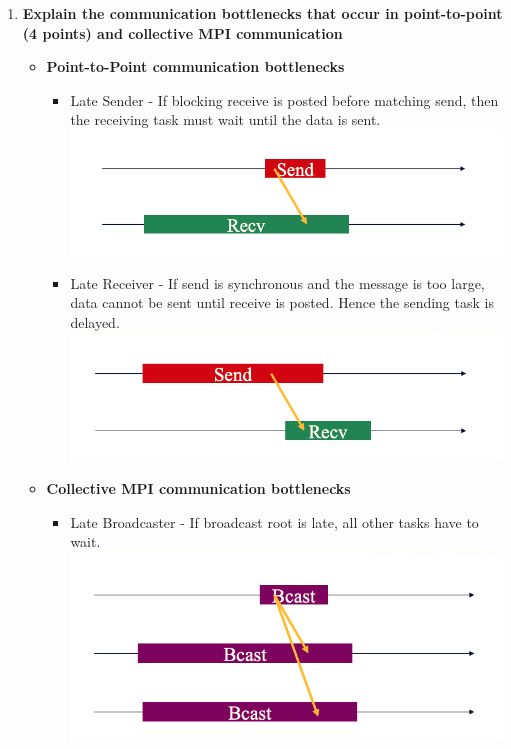 \documentclass[10pt, letterpaper, twoside]{article}
\begin{document}
\begin{titlepage}
\begin{enumerate}
\item \textbf{Explain the communication bottlenecks that occur in point-to-point (4 points) and collective MPI communication}
\begin{itemize}
	\item \textbf{Point-to-Point communication bottlenecks}
	\begin{itemize}
		\item Late Sender - If blocking receive is posted before matching send, then the receiving task must wait until the data is sent.\\
		\includegraphics[scale = 0.5]{late_sender.png}
		\item Late Receiver - If send is synchronous and the message is too large, data cannot be sent until receive is posted. Hence the sending task is delayed. \\
		\includegraphics[scale = 0.5]{late_receiver.png}
	\end{itemize}
	\item \textbf{Collective MPI communication bottlenecks}
	\begin{itemize}
		\item Late Broadcaster - If broadcast root is late, all other tasks have to wait. \\
		\includegraphics[scale = 0.5]{late_broadcast.png}

\end{itemize}
\end{itemize}
\end{enumerate}
\end{titlepage}
\end{document}
